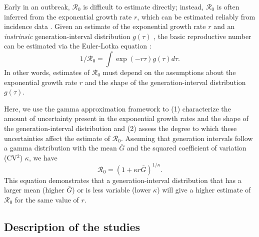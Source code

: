 \documentclass[12pt]{article}
\newcommand{\Rx}[1]{\ensuremath{{\mathcal R}_{#1}}}
\newcommand{\Ro}{\Rx{0}\xspace}
\begin{document}
Early in an outbreak, \Ro is difficult to estimate directly;
instead, \Ro is often inferred from the exponential growth rate $r$, which can be estimated reliably from incidence data \citep{mills2004transmissibility, nishiura2009transmission, ma2014estimating}.
Given an estimate of the exponential growth rate $r$ and an \emph{instrinsic} generation-interval distribution $g(\tau)$ \citep{champredon2015intrinsic}, the basic reproductive
number can be estimated via the Euler-Lotka equation \citep{wallinga2007generation}:
\begin{equation}
1/\mathcal R_0 = \int \exp(-r\tau) g(\tau) d\tau.
\label{eq:euler}
\end{equation}
In other words, estimates of \Ro must
depend on the assumptions about the
exponential growth rate $r$ and the shape of the generation-interval distribution $g(\tau)$.

Here, we use the gamma approximation framework \citep{mcbryde2009early, nishiura2009transmission, roberts2011early, park2019practical} to (1) characterize the amount of uncertainty present in the exponential growth rates and the shape of the generation-interval distribution and (2) assess the degree to which these uncertainties affect the estimate of \Ro.
Assuming that generation intervals follow a gamma distribution
with the mean $\bar G$ and the squared coefficient of variation (CV$^2$) $\kappa$, 
we have
\begin{equation}
\mathcal R_0 = \left(1 + \kappa r \bar{G}\right)^{1/\kappa}.
\label{eq:gamma}
\end{equation}
This equation demonstrates that a generation-interval distribution
that has a larger mean (higher $\bar{G}$) or is less variable (lower $\kappa$)
will give a higher estimate of \Ro for the same value of $r$.

\subsection{Description of the studies}
\end{document}

